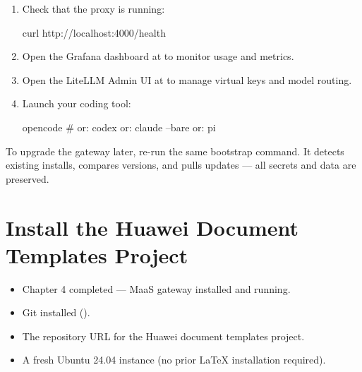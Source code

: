 \documentclass{guide}
\begin{document}
\stepbystep
\begin{enumerate}
  \item Check that the proxy is running:

  \begin{code}[bash]
curl http://localhost:4000/health
  \end{code}

  \item Open the Grafana dashboard at  to
        monitor usage and metrics.

  \item Open the LiteLLM Admin UI at  to
        manage virtual keys and model routing.

  \item Launch your coding tool:

  \begin{code}[bash]
opencode          # or:  codex  or:  claude --bare  or:  pi
  \end{code}
\end{enumerate}

\begin{tip}
To upgrade the gateway later, re-run the same bootstrap command. It detects
existing installs, compares versions, and pulls updates — all secrets and
data are preserved.
\end{tip}

\section{Install the Huawei Document Templates Project}

\begin{objectives}

  \prerequisites
  \begin{itemize}
    \item Chapter 4 completed — MaaS gateway installed and running.
    \item Git installed ().
    \item The repository URL for the Huawei document templates project.
    \item A fresh Ubuntu 24.04 instance (no prior LaTeX installation
          required).
  \end{itemize}
\end{objectives}
\end{document}
